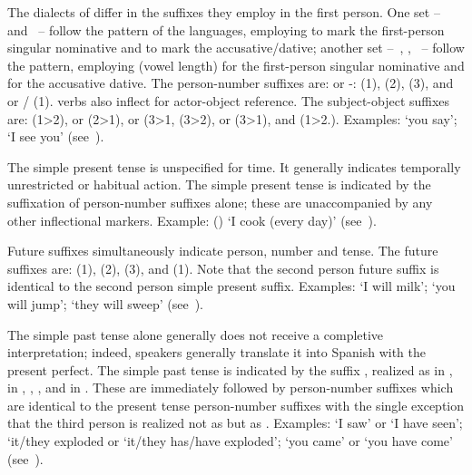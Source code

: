 The dialects of \SYQ{} differ in the suffixes they employ in the first person. One set --~\AMV{} and \LT~-- follow the pattern of the \QII{} languages, employing  to mark the first-person singular nominative and  to mark the accusative/dative; another set --~\ACH, \SP, \CH~-- follow the \QI{} pattern, employing \phono{-:} (vowel length) for the first-person singular nominative and  for the accusative dative. The person-number suffixes are:  or -: (1),  (2),  (3), and  or / \phono{-:} (1). \SYQ{} verbs also inflect for actor-object reference. The subject-object suffixes are:  (1>2),  or  (2>1),  or  (3>1,  (3>2),  or  (3>1), and  (1>2.). Examples:  ‘you say’;  ‘I see you’ (see~).
 
The simple present tense is unspecified for time. It generally indicates temporally unrestricted or habitual action. The simple present tense is indicated by the suffixation of person-number suffixes alone; these are unaccompanied by any other inflectional markers. Example:  () ‘I cook (every day)’ (see~). 

\largerpage
Future suffixes simultaneously indicate person, number and tense. The future suffixes are:  (1),  (2),  (3), and  (1). Note that the second person future suffix is identical to the second person simple present suffix. Examples:  ‘I will milk’;  ‘you will jump’;  ‘they will sweep’ (see~).

The simple past tense alone generally does not receive a completive interpretation; indeed, speakers generally translate it into Spanish with the present perfect. The simple past tense is indicated by the suffix , realized as  in \AMV,  in \ACH, \LT, \SP, and  in \CH. These are immediately followed by person-number suffixes which are identical to the present tense person-number suffixes with the single exception that the third person is realized not as  but as \phono{-\uo}. Examples:  ‘I saw’ or ‘I have seen’;  ‘it/they exploded or ‘it/they has/have exploded’;  ‘you came’ or ‘you have come’ (see~).

